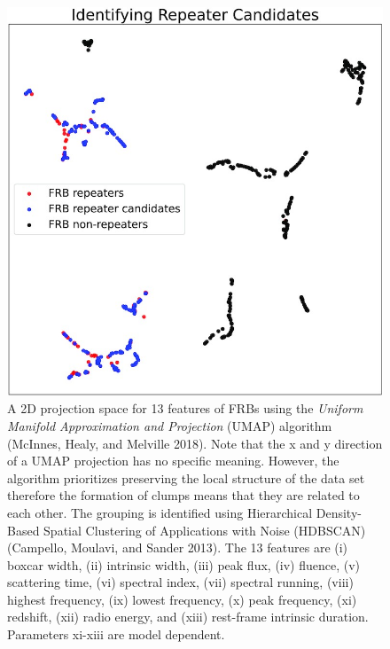 \documentclass[
  letterpaper,
  DIV=11,
  numbers=noendperiod]{scrreport}
\begin{document}
\begin{figure}

{\centering \includegraphics{././_assets/repeater-candidates_NC_Chen2022.jpg}

}

\caption{\label{fig-repeater-candidates-Chen2022}A 2D projection space
for 13 features of FRBs using the \emph{Uniform Manifold Approximation
and Projection} (UMAP) algorithm (McInnes, Healy, and Melville 2018).
Note that the x and y direction of a UMAP projection has no specific
meaning. However, the algorithm prioritizes preserving the local
structure of the data set therefore the formation of clumps means that
they are related to each other. The grouping is identified using
Hierarchical Density-Based Spatial Clustering of Applications with Noise
(HDBSCAN) (Campello, Moulavi, and Sander 2013). The 13 features are (i)
boxcar width, (ii) intrinsic width, (iii) peak flux, (iv) fluence, (v)
scattering time, (vi) spectral index, (vii) spectral running, (viii)
highest frequency, (ix) lowest frequency, (x) peak frequency, (xi)
redshift, (xii) radio energy, and (xiii) rest-frame intrinsic duration.
Parameters xi-xiii are model dependent.}

\end{figure}
\end{document}
